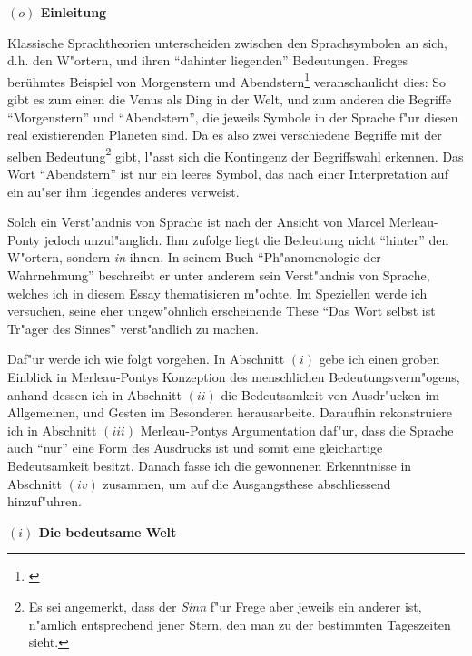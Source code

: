 \documentclass[a4paper, emulatestandardclasses, 12pt]{scrartcl}
\begin{document}
\begin{onehalfspace} 



\noindent\textbf{$(o)$ Einleitung}

\noindent Klassische Sprachtheorien unterscheiden zwischen den Sprachsymbolen an sich, d.h. den W"ortern, und ihren "`dahinter liegenden"' Bedeutungen. Freges berühmtes Beispiel von Morgenstern und Abendstern\footnote{\cite{sinnundbedeutung}} veranschaulicht dies: So gibt es zum einen die Venus als Ding in der Welt, und zum anderen die Begriffe "`Morgenstern"' und "`Abendstern"', die jeweils Symbole in der Sprache f"ur diesen real existierenden Planeten sind. Da es also zwei verschiedene Begriffe mit der selben Bedeutung\footnote{Es sei angemerkt, dass der \emph{Sinn} f"ur Frege aber jeweils ein anderer ist, n"amlich entsprechend jener Stern, den man zu der bestimmten Tageszeiten sieht.} gibt, l"asst sich die Kontingenz der Begriffswahl erkennen. Das Wort "`Abendstern"' ist nur ein leeres Symbol, das nach einer Interpretation auf ein au"ser ihm liegendes anderes verweist. 

Solch ein Verst"andnis von Sprache ist nach der Ansicht von Marcel Merleau-Ponty jedoch unzul"anglich. Ihm zufolge liegt die Bedeutung nicht "`hinter"' den W"ortern, sondern \emph{in} ihnen. In seinem Buch "`Ph"anomenologie der Wahrnehmung"' \citep{merleau1966phanomenologie} beschreibt er unter anderem sein Verst"andnis von Sprache, welches ich in diesem Essay thematisieren m"ochte. Im Speziellen werde ich versuchen, seine eher ungew"ohnlich erscheinende These "`Das Wort selbst ist Tr"ager des Sinnes"' verst"andlich zu machen.\newline

Daf"ur werde ich wie folgt vorgehen. In Abschnitt $(i)$ gebe ich einen groben Einblick in Merleau-Pontys Konzeption des menschlichen Bedeutungsverm"ogens, anhand dessen ich in Abschnitt $(ii)$ die Bedeutsamkeit von Ausdr"ucken im Allgemeinen, und Gesten im Besonderen herausarbeite. Daraufhin rekonstruiere ich in Abschnitt $(iii)$ Merleau-Pontys Argumentation daf"ur, dass die Sprache auch "`nur"' eine Form des Ausdrucks ist und somit eine gleichartige Bedeutsamkeit besitzt. Danach fasse ich die gewonnenen Erkenntnisse in Abschnitt $(iv)$ zusammen, um auf die Ausgangsthese abschliessend hinzuf"uhren.

\vspace{5mm}

\noindent\textbf{$(i)$ Die bedeutsame Welt}


\end{onehalfspace}
\end{document}
